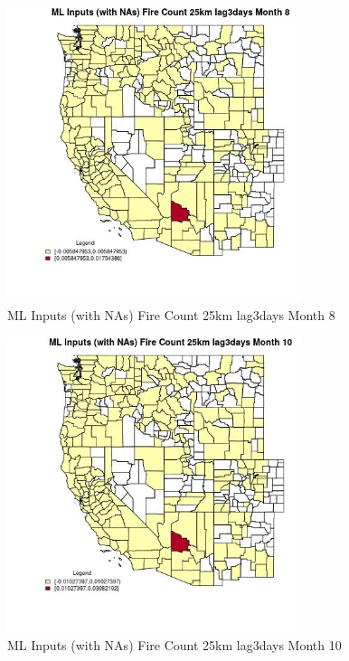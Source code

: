 \begin{figure} 
\centering  
\includegraphics[width=0.77\textwidth]{Code_Outputs/Report_ML_input_PM25_Step4_part_e_de_duplicated_aves_compiled_2019-05-20wNAs_CountyFire_Count_25km_lag3daysmedianMonth8.jpg} 
\caption{\label{fig:Report_ML_input_PM25_Step4_part_e_de_duplicated_aves_compiled_2019-05-20wNAsCountyFire_Count_25km_lag3daysmedianMonth8}ML Inputs (with NAs) Fire Count 25km lag3days Month 8} 
\end{figure} 
 

\begin{figure} 
\centering  
\includegraphics[width=0.77\textwidth]{Code_Outputs/Report_ML_input_PM25_Step4_part_e_de_duplicated_aves_compiled_2019-05-20wNAs_CountyFire_Count_25km_lag3daysmedianMonth10.jpg} 
\caption{\label{fig:Report_ML_input_PM25_Step4_part_e_de_duplicated_aves_compiled_2019-05-20wNAsCountyFire_Count_25km_lag3daysmedianMonth10}ML Inputs (with NAs) Fire Count 25km lag3days Month 10} 
\end{figure} 
 

